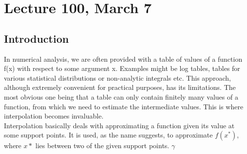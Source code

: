 \chapter*{Lecture 100, March 7}
\setcounter{chapter}{4}
\setcounter{section}{0}

\section{Introduction}

In numerical analysis, we are often provided with a table of values of a function f(x) with respect to some argument x. Examples might be log tables, tables for various statistical distributions or non-analytic integrals etc. This approach, although extremely convenient for practical purposes, has its limitations. The most obvious one being that a table can only contain finitely many values of a function, from which we need to estimate the intermediate values. This is where interpolation becomes invaluable.\\
Interpolation basically deals with approximating a function given its value at some support points. It is used, as the name suggests, to approximate $f(x^*)$, where $x*$ lies between two of the given support points.
$\gamma$